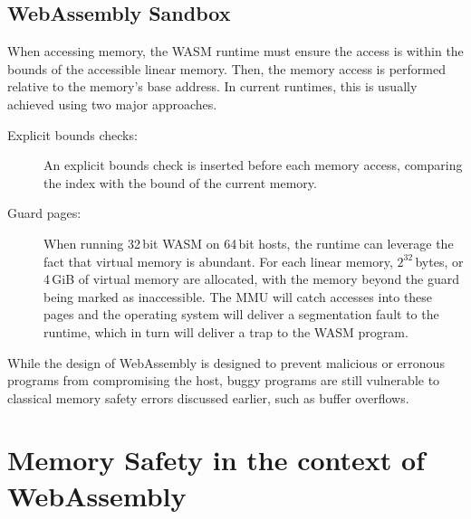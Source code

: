 \subsection{WebAssembly Sandbox}
\label{subsec:webassembly-sandbox}
When accessing memory, the \ac{WASM} runtime must ensure the access is within the bounds of the accessible linear memory.
Then, the memory access is performed relative to the memory's base address.
In current runtimes, this is usually achieved using two major approaches.
\begin{description}
    \item[Explicit bounds checks:] An explicit bounds check is inserted before each memory access, comparing the index with the bound of the current memory.
    \item[Guard pages:] When running 32\,bit \ac{WASM} on 64\,bit hosts, the runtime can leverage the fact that virtual memory is abundant.
    For each linear memory, $2^{32}$\,bytes, or 4\,GiB of virtual memory are allocated, with the memory beyond the guard being marked as inaccessible.
    The \ac{MMU} will catch accesses into these pages and the operating system will deliver a segmentation fault to the runtime, which in turn will deliver a trap to the \ac{WASM} program.
\end{description}


While the design of WebAssembly is designed to prevent malicious or erronous programs from compromising the host, buggy programs are still vulnerable to classical memory safety errors discussed earlier, such as buffer overflows.

\section{Memory Safety in the context of WebAssembly}
\label{sec:memory-safety}

